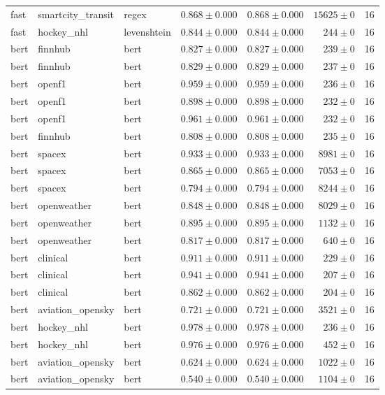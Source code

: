 \begin{table}[htbp]
\begin{tabular}{l l l r r r r}
fast & smartcity\_transit & regex & $0.868\pm0.000$ & $0.868\pm0.000$ & $15625\pm0$ & 16 \\
fast & hockey\_nhl & levenshtein & $0.844\pm0.000$ & $0.844\pm0.000$ & $244\pm0$ & 16 \\
bert & finnhub & bert & $0.827\pm0.000$ & $0.827\pm0.000$ & $239\pm0$ & 16 \\
bert & finnhub & bert & $0.829\pm0.000$ & $0.829\pm0.000$ & $237\pm0$ & 16 \\
bert & openf1 & bert & $0.959\pm0.000$ & $0.959\pm0.000$ & $236\pm0$ & 16 \\
bert & openf1 & bert & $0.898\pm0.000$ & $0.898\pm0.000$ & $232\pm0$ & 16 \\
bert & openf1 & bert & $0.961\pm0.000$ & $0.961\pm0.000$ & $232\pm0$ & 16 \\
bert & finnhub & bert & $0.808\pm0.000$ & $0.808\pm0.000$ & $235\pm0$ & 16 \\
bert & spacex & bert & $0.933\pm0.000$ & $0.933\pm0.000$ & $8981\pm0$ & 16 \\
bert & spacex & bert & $0.865\pm0.000$ & $0.865\pm0.000$ & $7053\pm0$ & 16 \\
bert & spacex & bert & $0.794\pm0.000$ & $0.794\pm0.000$ & $8244\pm0$ & 16 \\
bert & openweather & bert & $0.848\pm0.000$ & $0.848\pm0.000$ & $8029\pm0$ & 16 \\
bert & openweather & bert & $0.895\pm0.000$ & $0.895\pm0.000$ & $1132\pm0$ & 16 \\
bert & openweather & bert & $0.817\pm0.000$ & $0.817\pm0.000$ & $640\pm0$ & 16 \\
bert & clinical & bert & $0.911\pm0.000$ & $0.911\pm0.000$ & $229\pm0$ & 16 \\
bert & clinical & bert & $0.941\pm0.000$ & $0.941\pm0.000$ & $207\pm0$ & 16 \\
bert & clinical & bert & $0.862\pm0.000$ & $0.862\pm0.000$ & $204\pm0$ & 16 \\
bert & aviation\_opensky & bert & $0.721\pm0.000$ & $0.721\pm0.000$ & $3521\pm0$ & 16 \\
bert & hockey\_nhl & bert & $0.978\pm0.000$ & $0.978\pm0.000$ & $236\pm0$ & 16 \\
bert & hockey\_nhl & bert & $0.976\pm0.000$ & $0.976\pm0.000$ & $452\pm0$ & 16 \\
bert & aviation\_opensky & bert & $0.624\pm0.000$ & $0.624\pm0.000$ & $1022\pm0$ & 16 \\
bert & aviation\_opensky & bert & $0.540\pm0.000$ & $0.540\pm0.000$ & $1104\pm0$ & 16 \\

\end{tabular}
\end{table}
